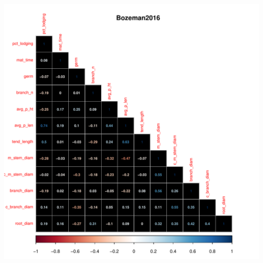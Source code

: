 \documentclass[11pt]{article}
\begin{document}
\begin{knitrout}\footnotesize
{}\color{fgcolor}

{\centering \includegraphics[width=\maxwidth]{figure/bz-1} 

}



\end{knitrout}
\end{document}
